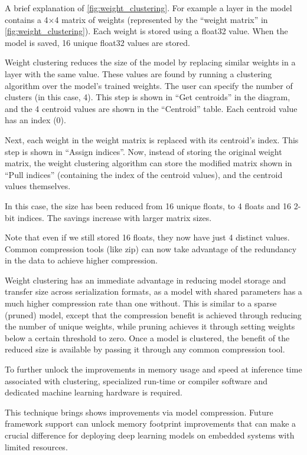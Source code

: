 A brief explanation of \autoref{fig:weight_clustering}. For example a layer in
the model contains a 4$\times$4 matrix of weights (represented by the
``weight matrix'' in \autoref{fig:weight_clustering}). Each weight is stored
using a float32 value. When the model is saved, 16 unique float32 values are
stored.

Weight clustering reduces the size of the model by replacing similar weights in
a layer with the same value. These values are found by running a clustering
algorithm over the model’s trained weights. The user can specify the number of
clusters (in this case, 4). This step is shown in ``Get centroids'' in the
diagram, and the 4 centroid values are shown in the ``Centroid'' table. Each
centroid value has an index (0).

Next, each weight in the weight matrix is replaced with its centroid’s index.
This step is shown in ``Assign indices''. Now, instead of storing the original
weight matrix, the weight clustering algorithm can store the modified matrix
shown in ``Pull indices'' (containing the index of the centroid values), and
the centroid values themselves.

In this case, the size has been reduced from 16 unique floats, to 4 floats and
16 2-bit indices. The savings increase with larger matrix sizes.

Note that even if we still stored 16 floats, they now have just 4 distinct
values. Common compression tools (like zip) can now take advantage of the
redundancy in the data to achieve higher compression.

Weight clustering has an immediate advantage in reducing model storage and
transfer size across serialization formats, as a model with shared parameters
has a much higher compression rate than one without. This is similar to a
sparse (pruned) model, except that the compression benefit is achieved through
reducing the number of unique weights, while pruning achieves it through
setting weights below a certain threshold to zero. Once a model is clustered,
the benefit of the reduced size is available by passing it through any common
compression tool.

To further unlock the improvements in memory usage and speed at inference time
associated with clustering, specialized run-time or compiler software and
dedicated machine learning hardware is required.~\cite{tfmot:clustering_blog}

This technique brings shows improvements via model compression. Future
framework support can unlock memory footprint improvements that can make a
crucial difference for deploying deep learning models on embedded systems with
limited resources.

